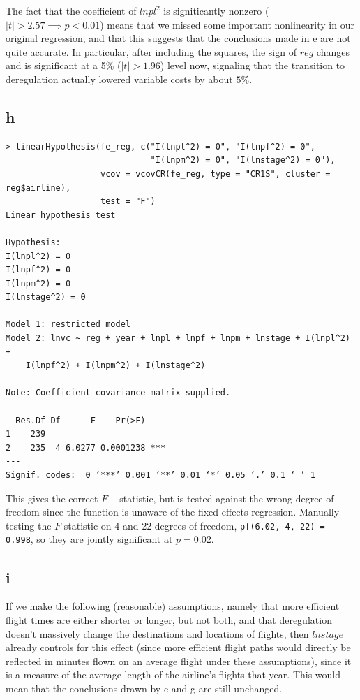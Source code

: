 \documentclass[12pt,letterpaper]{article}
\theoremstyle{definition}
\begin{document}
The fact that the coefficient of $lnpl^2$ is signiticantly nonzero ($|t| > 2.57 \implies p < 0.01$) means that we missed some important nonlinearity in our original regression, and that this suggests that the conclusions made in e are not quite accurate. In particular, after including the squares, the sign of $reg$ changes and is significant at a 5\% ($|t| > 1.96$) level now, signaling that the transition to deregulation actually lowered variable costs by about $5\%$.

\subsection*{h}
\begin{Verbatim}[fontsize=\small]
> linearHypothesis(fe_reg, c("I(lnpl^2) = 0", "I(lnpf^2) = 0",
                             "I(lnpm^2) = 0", "I(lnstage^2) = 0"),
                   vcov = vcovCR(fe_reg, type = "CR1S", cluster = reg$airline),
                   test = "F")
Linear hypothesis test

Hypothesis:
I(lnpl^2) = 0
I(lnpf^2) = 0
I(lnpm^2) = 0
I(lnstage^2) = 0

Model 1: restricted model
Model 2: lnvc ~ reg + year + lnpl + lnpf + lnpm + lnstage + I(lnpl^2) +
    I(lnpf^2) + I(lnpm^2) + I(lnstage^2)

Note: Coefficient covariance matrix supplied.

  Res.Df Df      F    Pr(>F)
1    239
2    235  4 6.0277 0.0001238 ***
---
Signif. codes:  0 ‘***’ 0.001 ‘**’ 0.01 ‘*’ 0.05 ‘.’ 0.1 ‘ ’ 1
\end{Verbatim}

This gives the correct $F-$statistic, but is tested against the wrong degree of freedom since the function is unaware of the fixed effects regression. Manually testing the $F$-statistic on $4$ and $22$ degrees of freedom, \verb|pf(6.02, 4, 22) = 0.998|, so they are jointly significant at $p = 0.02$.

\subsection*{i}

If we make the following (reasonable) assumptions, namely that more efficient flight times are either shorter or longer, but not both, and that deregulation doesn't massively change the destinations and locations of flights, then $lnstage$ already controls for this effect (since more efficient flight paths would directly be reflected in minutes flown on an average flight under these assumptions), since it is a measure of the average length of the airline’s flights that year. This would mean that the conclusions drawn by e and g are still unchanged.
\end{document}
